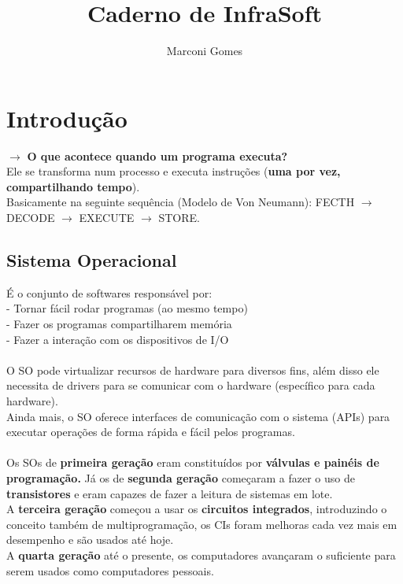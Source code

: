 \documentclass[12pt]{article}
\begin{document}
\nocite{*}

\title{Caderno de InfraSoft}
\author{Marconi Gomes}

\maketitle


\section{Introdução}
    $\rightarrow$ \textbf{O que acontece quando um programa executa?} 
    \\ Ele se transforma num processo e executa instruções (\textbf{uma por vez, compartilhando tempo}). 
    \\Basicamente na seguinte sequência (Modelo de Von Neumann): FECTH $\rightarrow$ DECODE $\rightarrow$ EXECUTE $\rightarrow$ STORE.
    
    \subsection{Sistema Operacional}
    É o conjunto de softwares responsável por: 
    \\  - Tornar fácil rodar programas (ao mesmo tempo)
    \\  - Fazer os programas compartilharem memória
    \\  - Fazer a interação com os dispositivos de I/O
    \\~\\O SO pode virtualizar recursos de hardware para diversos fins, além disso ele necessita de drivers para se comunicar com o hardware (específico para cada hardware).
    \\Ainda mais, o SO oferece interfaces de comunicação com o sistema (APIs) para executar operações de forma rápida e fácil pelos programas.
    \\~\\Os SOs de \textbf{primeira geração} eram constituídos por \textbf{válvulas e painéis de programação.} Já os de \textbf{segunda geração} começaram a fazer o uso de \textbf{transistores} e eram capazes de fazer a leitura de sistemas em lote.
    \\A \textbf{terceira geração} começou a usar os \textbf{circuitos integrados}, introduzindo o conceito também de multiprogramação, os CIs foram melhoras cada vez mais em desempenho e são usados até hoje.
    \\A \textbf{quarta geração} até o presente, os computadores avançaram o suficiente para serem usados como computadores pessoais.

\end{document}
